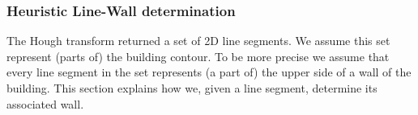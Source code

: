 \documentclass[10pt]{article}
\begin{document}
\subsubsection{Heuristic Line-Wall determination}
%
% 
% 

	The Hough transform returned a set of 2D line segments. We assume this set
	represent (parts of) the building contour. To be more precise we assume
	that every line segment in the set represents (a part of) the upper side of
	a wall of the building. This section explains how we, given a line
	segment, determine its associated wall.

	
\end{document}
